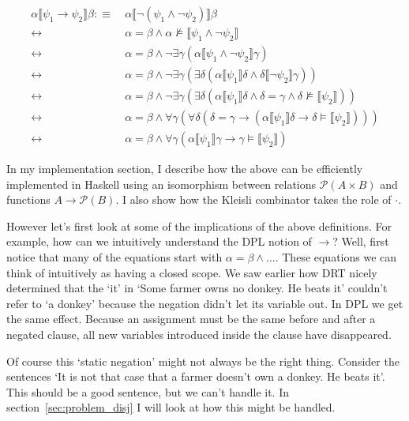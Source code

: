 \documentclass[12pt]{article}
\begin{document}
\begin{align}
\alpha\llbracket \psi_1\rightarrow\psi_2\rrbracket \beta
 :\equiv&\ \alpha\llbracket \neg(\psi_1\wedge\neg\psi_2)\rrbracket \beta \nonumber\\
 \leftrightarrow&\ \alpha = \beta \wedge \alpha\not\models\llbracket \psi_1\wedge\neg\psi_2\rrbracket  \nonumber\\
 \leftrightarrow&\ \alpha = \beta \wedge \neg\exists\gamma(\alpha\llbracket \psi_1\wedge\neg\psi_2\rrbracket \gamma) \nonumber\\
 \leftrightarrow&\ \alpha = \beta \wedge \neg\exists\gamma(\exists\delta(\alpha\llbracket \psi_1\rrbracket \delta\wedge\delta\llbracket \neg\psi_2\rrbracket \gamma)) \nonumber\\
 \leftrightarrow&\ \alpha = \beta \wedge \neg\exists\gamma(\exists\delta(\alpha\llbracket \psi_1\rrbracket \delta\wedge\delta=\gamma\wedge\delta\not\models\llbracket \psi_2\rrbracket )) \nonumber\\
 \leftrightarrow&\ \alpha = \beta \wedge \forall\gamma(\forall\delta(\delta=\gamma\rightarrow(\alpha\llbracket \psi_1\rrbracket \delta\rightarrow\delta\models\llbracket \psi_2\rrbracket ))) \nonumber\\
 \leftrightarrow&\ \alpha = \beta \wedge \forall\gamma(\alpha\llbracket \psi_1\rrbracket \gamma\rightarrow\gamma\models\llbracket \psi_2\rrbracket ) \label{sem_impl}
\end{align}



In my implementation section, I describe how the above can be efficiently implemented in Haskell using an isomorphism between relations $\mathcal{P}(A\times B)$ and functions $A\to\mathcal{P}(B)$. I also show how the Kleisli combinator takes the role of $\cdot$.

However let's first look at some of the implications of the above definitions. For example, how can we intuitively understand the DPL notion of $\rightarrow$? Well, first notice that many of the equations start with $\alpha=\beta\wedge\dots$. These equations we can think of intuitively as having a closed scope. We saw earlier how DRT nicely determined that the `it' in `Some farmer owns no donkey. He beats it' couldn't refer to `a donkey' because the negation didn't let its variable out. In DPL we get the same effect. Because an assignment must be the same before and after a negated clause, all new variables introduced inside the clause have disappeared.

Of course this `static negation' might not always be the right thing. Consider the sentences `It is not that case that a farmer doesn't own a donkey. He beats it'. This should be a good sentence, but we can't handle it. In section~\ref{sec:problem_disj} I will look at how this might be handled.
\end{document}
